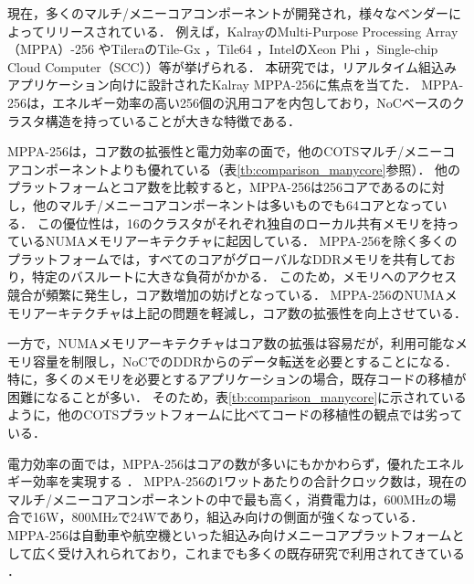 \documentclass[submit,techrep]{ipsj_v2/UTF8/ipsj}
\begin{document}
現在，多くのマルチ/メニーコアコンポーネントが開発され，様々なベンダーによってリリースされている．
例えば，KalrayのMulti-Purpose Processing Array（MPPA）-256 \cite{de2014time}やTileraのTile-Gx \cite{ramey2011tile} \cite{schooler2010tile}，Tile64 \cite{bell2008tile64}，IntelのXeon Phi \cite{chrysos2014intel} \cite{chrysos2012intel}，Single-chip Cloud Computer（SCC）\cite{baron2010single}）等が挙げられる．
本研究では，リアルタイム組込みアプリケーション向けに設計されたKalray MPPA-256に焦点を当てた．
MPPA-256は，エネルギー効率の高い256個の汎用コアを内包しており，NoCベースのクラスタ構造を持っていることが大きな特徴である．

MPPA-256は，コア数の拡張性と電力効率の面で，他のCOTSマルチ/メニーコアコンポーネントよりも優れている（表\ref{tb:comparison_manycore}参照）．
他のプラットフォームとコア数を比較すると，MPPA-256は256コアであるのに対し，他のマルチ/メニーコアコンポーネントは多いものでも64コアとなっている．
この優位性は，16のクラスタがそれぞれ独自のローカル共有メモリを持っているNUMAメモリアーキテクチャに起因している．
MPPA-256を除く多くのプラットフォームでは，すべてのコアがグローバルなDDRメモリを共有しており，特定のバスルートに大きな負荷がかかる．
このため，メモリへのアクセス競合が頻繁に発生し，コア数増加の妨げとなっている．
MPPA-256のNUMAメモリアーキテクチャは上記の問題を軽減し，コア数の拡張性を向上させている．

一方で，NUMAメモリアーキテクチャはコア数の拡張は容易だが，利用可能なメモリ容量を制限し，NoCでのDDRからのデータ転送を必要とすることになる．
特に，多くのメモリを必要とするアプリケーションの場合，既存コードの移植が困難になることが多い．
そのため，表\ref{tb:comparison_manycore}に示されているように，他のCOTSプラットフォームに比べてコードの移植性の観点では劣っている．

電力効率の面では，MPPA-256はコアの数が多いにもかかわらず，優れたエネルギー効率を実現する \cite{kanter2015kalray}．
MPPA-256の1ワットあたりの合計クロック数は，現在のマルチ/メニーコアコンポーネントの中で最も高く，消費電力は，600MHzの場合で16W，800MHzで24Wであり，組込み向けの側面が強くなっている．
MPPA-256は自動車や航空機といった組込み向けメニーコアプラットフォームとして広く受け入れられており，これまでも多くの既存研究で利用されてきている \cite{carle2014static} \cite{perret2016mapping} \cite{perret2016predictable}．
\end{document}
